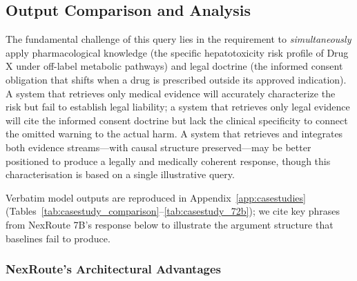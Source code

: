 \documentclass[a4paper,fleql]{cas-sc}
\begin{document}
\subsection{Output Comparison and Analysis}
\label{ssec:output}
The fundamental challenge of this query lies in the requirement to
\emph{simultaneously} apply pharmacological knowledge (the specific
hepatotoxicity risk profile of Drug X under off-label metabolic pathways) and
legal doctrine (the informed consent obligation that shifts when a drug is
prescribed outside its approved indication). A system that retrieves only
medical evidence will accurately characterize the risk but fail to establish
legal liability; a system that retrieves only legal evidence will cite the
informed consent doctrine but lack the clinical specificity to connect the
omitted warning to the actual harm. A system that retrieves and integrates both evidence streams---with causal
structure preserved---may be better positioned to produce a legally and
medically coherent response, though this characterisation is based on a
single illustrative query.

Verbatim model outputs are reproduced in Appendix~\ref{app:casestudies} (Tables~\ref{tab:casestudy_comparison}--\ref{tab:casestudy_72b}); we cite key phrases from NexRoute 7B's response below to illustrate the argument structure that baselines fail to produce.

\subsubsection{NexRoute's Architectural Advantages}
\label{sssec:nexroute-advantages}
\end{document}
